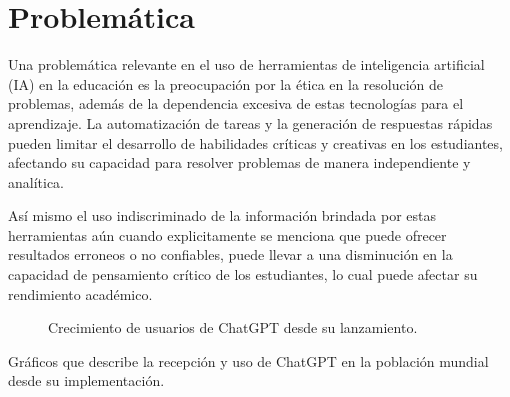 \documentclass{article}
\newenvironment{problematica}{}{}
\begin{document}
\begin{problematica}

  \section{Problemática}

  Una problemática relevante en el uso de herramientas de inteligencia artificial (IA) en la educación es la preocupación por la ética en la resolución de problemas, además de la dependencia excesiva de estas tecnologías para el aprendizaje. La automatización de tareas y la generación de respuestas rápidas pueden limitar el desarrollo de habilidades críticas y creativas en los estudiantes, afectando su capacidad para resolver problemas de manera independiente y analítica.

  Así mismo el uso indiscriminado de la información brindada por estas herramientas aún cuando explicitamente se menciona que puede ofrecer resultados erroneos o no confiables, puede llevar a una disminución en la capacidad de pensamiento crítico de los estudiantes, lo cual puede afectar su rendimiento académico.
  
  \begin{figure}[ht]
    \centering
    \caption{Crecimiento de usuarios de ChatGPT desde su lanzamiento.}
    \label{fig:usuarios_chatgpt}
  \end{figure}
    Gráficos que describe la recepción y uso de ChatGPT en la población mundial desde su implementación.
\end{problematica}
\end{document}
